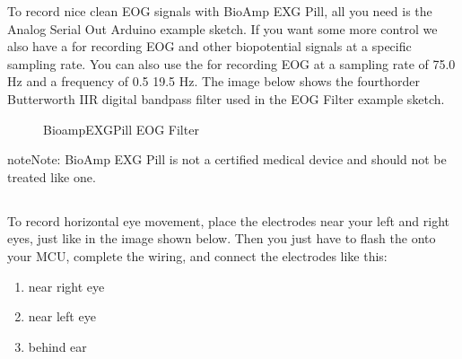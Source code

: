 \documentclass[a4paper,10pt,english,oneside]{sphinxmanual}
\let\sphinxpxdimen\pdfpxdimen\else\newdimen\sphinxpxdimen
\begin{document}
\sphinxAtStartPar
To record nice clean EOG signals with BioAmp EXG Pill, all you need is the Analog Serial Out Arduino example sketch. If you want some more control we also have a  for recording EOG and other biopotential signals at a specific sampling rate. You can also use the  for recording EOG at a sampling rate of 75.0 Hz and a frequency of 0.5 \sphinxhyphen{} 19.5 Hz. The image below shows the fourth\sphinxhyphen{}order Butterworth IIR digital bandpass filter used in the EOG Filter example sketch.

\begin{figure}[htbp]
\centering
\capstart

\noindent\sphinxincludegraphics[width=600\sphinxpxdimen]{{bioamp-exg-pill-eogfilter}.jpg}
\caption{Bioamp\sphinxhyphen{}EXG\sphinxhyphen{}Pill EOG Filter}\label{\detokenize{applications/index:id23}}\end{figure}

\begin{sphinxadmonition}{note}{Note:}
\sphinxAtStartPar
BioAmp EXG Pill is not a certified medical device and should not be treated like one.
\end{sphinxadmonition}

\begin{DUlineblock}{0em}
\item[] 
\end{DUlineblock}


\subsection{}
\label{\detokenize{applications/index:recording-horizontal-eye-movement}}
\sphinxAtStartPar
To record horizontal eye movement, place the electrodes near your left and right eyes, just like in the image shown below. Then you just have to flash the  onto your MCU, complete the wiring, and connect the electrodes like this:
\begin{enumerate}
%
\item {} 
\sphinxAtStartPar
{} near right eye

\item {} 
\sphinxAtStartPar
{} near left eye

\item {} 
\sphinxAtStartPar
{} behind ear

\end{enumerate}
\end{document}
